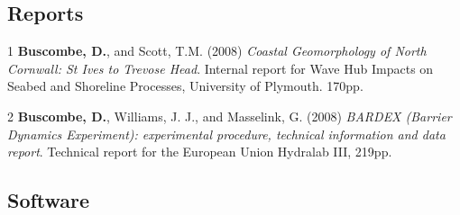 \documentclass[margin,line]{resume}
\begin{document}
\begin{resume}
\begin{footnotesize}
\begin{list1}
	\end{list1}

        \end{footnotesize}

	\subsection{\mysidestyle Reports}
        \begin{footnotesize}
	\begin{list1}
	 
	\item[1] {\bf Buscombe, D.}, and Scott, T.M. (2008) {\sl Coastal Geomorphology of North Cornwall: St Ives to Trevose Head}. Internal report for Wave Hub Impacts on Seabed and Shoreline Processes, University of Plymouth. 170pp.\\
	\item[2] {\bf Buscombe, D.}, Williams, J. J., and Masselink, G. (2008) {\sl BARDEX (Barrier Dynamics Experiment): experimental procedure, technical information and data report}. Technical report for the European Union Hydralab III, 219pp. 

	\end{list1}
        \end{footnotesize}

	\subsection{\mysidestyle Software}

        \begin{footnotesize}
	\begin{list1}
	 

\end{list1}
\end{footnotesize}
\end{resume}
\end{document}
